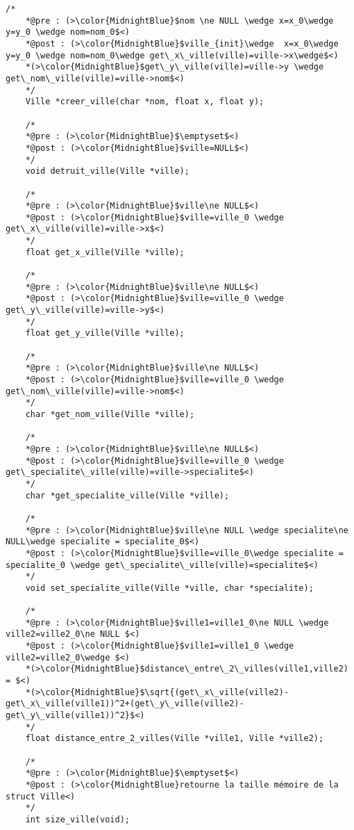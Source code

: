 \documentclass[a4paper, 11pt, oneside]{article}
\begin{document}
\begin{lstlisting}[caption = {Spécification des fonctions et procédures du header "ville.h"}]
    /*
    *@pre : (>\color{MidnightBlue}$nom \ne NULL \wedge x=x_0\wedge y=y_0 \wedge nom=nom_0$<)
    *@post : (>\color{MidnightBlue}$ville_{init}\wedge  x=x_0\wedge y=y_0 \wedge nom=nom_0\wedge get\_x\_ville(ville)=ville->x\wedge$<)
    *(>\color{MidnightBlue}$get\_y\_ville(ville)=ville->y \wedge get\_nom\_ville(ville)=ville->nom$<)
    */
    Ville *creer_ville(char *nom, float x, float y);

    /*
    *@pre : (>\color{MidnightBlue}$\emptyset$<)
    *@post : (>\color{MidnightBlue}$ville=NULL$<)
    */
    void detruit_ville(Ville *ville);
    
    /*
    *@pre : (>\color{MidnightBlue}$ville\ne NULL$<)
    *@post : (>\color{MidnightBlue}$ville=ville_0 \wedge get\_x\_ville(ville)=ville->x$<)
    */
    float get_x_ville(Ville *ville);
    
    /*
    *@pre : (>\color{MidnightBlue}$ville\ne NULL$<)
    *@post : (>\color{MidnightBlue}$ville=ville_0 \wedge get\_y\_ville(ville)=ville->y$<)
    */
    float get_y_ville(Ville *ville);
    
    /*
    *@pre : (>\color{MidnightBlue}$ville\ne NULL$<)
    *@post : (>\color{MidnightBlue}$ville=ville_0 \wedge get\_nom\_ville(ville)=ville->nom$<)
    */
    char *get_nom_ville(Ville *ville);
    
    /*
    *@pre : (>\color{MidnightBlue}$ville\ne NULL$<)
    *@post : (>\color{MidnightBlue}$ville=ville_0 \wedge get\_specialite\_ville(ville)=ville->specialite$<)
    */
    char *get_specialite_ville(Ville *ville);
    
    /*
    *@pre : (>\color{MidnightBlue}$ville\ne NULL \wedge specialite\ne NULL\wedge specialite = specialite_0$<)
    *@post : (>\color{MidnightBlue}$ville=ville_0\wedge specialite = specialite_0 \wedge get\_specialite\_ville(ville)=specialite$<)
    */
    void set_specialite_ville(Ville *ville, char *specialite);
    
    /*
    *@pre : (>\color{MidnightBlue}$ville1=ville1_0\ne NULL \wedge ville2=ville2_0\ne NULL $<)
    *@post : (>\color{MidnightBlue}$ville1=ville1_0 \wedge ville2=ville2_0\wedge $<)
    *(>\color{MidnightBlue}$distance\_entre\_2\_villes(ville1,ville2) = $<)
    *(>\color{MidnightBlue}$\sqrt{(get\_x\_ville(ville2)-get\_x\_ville(ville1))^2+(get\_y\_ville(ville2)-get\_y\_ville(ville1))^2}$<)
    */
    float distance_entre_2_villes(Ville *ville1, Ville *ville2);
    
    /*
    *@pre : (>\color{MidnightBlue}$\emptyset$<)
    *@post : (>\color{MidnightBlue}retourne la taille mémoire de la struct Ville<)
    */
    int size_ville(void);
\end{lstlisting}
\end{document}
